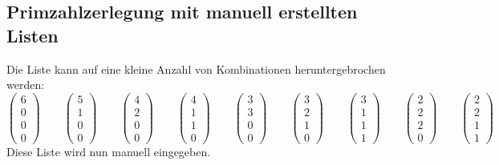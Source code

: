 \documentclass[10pt, fleqn]{article}
\begin{document}
\subsection{Primzahlzerlegung mit manuell erstellten Listen}
Die Liste kann auf eine kleine Anzahl von Kombinationen heruntergebrochen 
werden: 
\[ \begin{pmatrix}6\\0\\0\\0\end{pmatrix} \qquad 
   \begin{pmatrix}5\\1\\0\\0\end{pmatrix} \qquad 
   \begin{pmatrix}4\\2\\0\\0\end{pmatrix} \qquad 
   \begin{pmatrix}4\\1\\1\\0\end{pmatrix} \qquad 
   \begin{pmatrix}3\\3\\0\\0\end{pmatrix} \qquad 
   \begin{pmatrix}3\\2\\1\\0\end{pmatrix} \qquad 
   \begin{pmatrix}3\\1\\1\\1\end{pmatrix} \qquad 
   \begin{pmatrix}2\\2\\2\\0\end{pmatrix} \qquad 
   \begin{pmatrix}2\\2\\1\\1\end{pmatrix} \qquad \]
Diese Liste wird nun manuell eingegeben. 
% 
\end{document}
